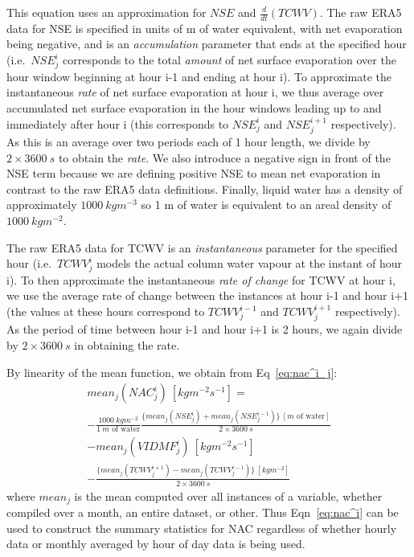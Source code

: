 This equation uses an approximation for $NSE$ and $\frac{d}{dt} (TCWV)$. The raw \ac{ERA5} data for \ac{NSE} is specified in units of m of water equivalent, with net evaporation being negative, and is an \textit{accumulation} parameter that ends at the specified hour (i.e.\ $NSE^i_j$ corresponds to the total \textit{amount} of net surface evaporation over the hour window beginning at hour i-1 and ending at hour i). To approximate the instantaneous \textit{rate} of net surface evaporation at hour i, we thus average over accumulated net surface evaporation in the hour windows leading up to and immediately after hour i (this corresponds to $NSE^i_j$ and $NSE^{i+1}_j$ respectively). As this is an average over two periods each of 1 hour length, we divide by $2 \times 3600 \ s$ to obtain the \textit{rate}. We also introduce a negative sign in front of the \ac{NSE} term because we are defining positive \ac{NSE} to mean net evaporation in contrast to the raw \ac{ERA5} data definitions. Finally, liquid water has a density of approximately $1000 \ kg m^{-3}$ so 1 m of water is equivalent to an areal density of $1000 \ kg m^{-2}$.

The raw \ac{ERA5} data for \ac{TCWV} is an \textit{instantaneous} parameter for the specified hour (i.e.\ $TCWV^i_j$ models the actual column water vapour at the instant of hour i). To then approximate the instantaneous \textit{rate of change} for \ac{TCWV} at hour i, we use the average rate of change between the instances at hour i-1 and hour i+1 (the values at these hours correspond to $TCWV^{i-1}_j$ and $TCWV^{i+1}_j$ respectively). As the period of time between hour i-1 and hour i+1 is 2 hours, we again divide by $2 \times 3600 \ s$ in obtaining the rate.

By linearity of the mean function, we obtain from Eq~\ref{eq:nac^i_j}:
\begin{eqnarray}
	\label{eq:nac^i}
	mean_j(NAC^i_j) \ [kg m^{-2} s^{-1}] = \\
	- \frac{1000 \ kg m^{-2}}{1 \ m \mbox{ of water}} \frac{\{mean_j(NSE^i_j) + mean_j(NSE^{i-1}_j)\} \ [m \mbox{ of water} ]}{2 \times 3600 \ s} \nonumber \\
	- mean_j(VIDMF^i_j) \ [kg m^{-2} s^{-1}] \nonumber \\ 
	- \frac{\{mean_j(TCWV^{i+1}_j) - mean_j(TCWV^{i-1}_j)\} \ [kg m^{-2}]}{2 \times 3600 \ s} \nonumber
\end{eqnarray}
where $mean_j$ is the mean computed over all instances of a variable, whether compiled over a month, an entire dataset, or other. Thus Eqn~\ref{eq:nac^i} can be used to construct the summary statistics for \ac{NAC} regardless of whether hourly data or monthly averaged by hour of day data is being used.

